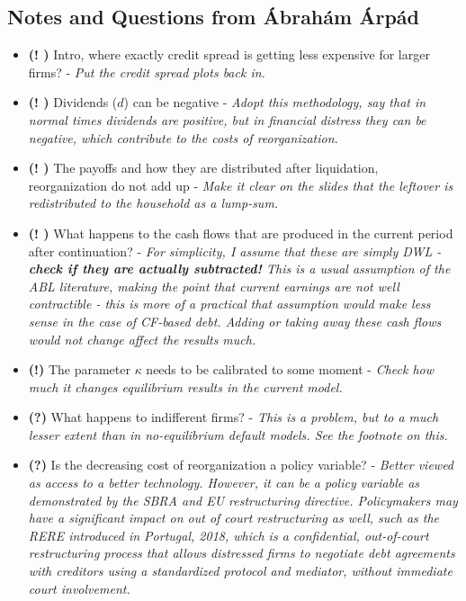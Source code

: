 \documentclass[12pt]{article}
\begin{document}
\subsection*{Notes and Questions from Ábrahám Árpád}
\begin{itemize} \setlength\itemsep{0em}  \small
    \item \textbf{(! \checkmark)} Intro, where exactly credit spread is getting less expensive for larger firms? - \textit{Put the credit spread plots back in.}
    \item \textbf{(! \checkmark)} Dividends ($d$) can be negative - \textit{Adopt this methodology, say that in normal times dividends are positive, but in financial distress they can be negative, which contribute to the costs of reorganization.}
    \item \textbf{(! \checkmark)} The payoffs and how they are distributed after liquidation, reorganization do not add up - \textit{Make it clear on the slides that the leftover is redistributed to the household as a lump-sum.}
    \item \textbf{(! \checkmark)} What happens to the cash flows that are produced in the current period after continuation? - \textit{For simplicity, I assume that these are simply DWL - \textbf{check if they are actually subtracted!} This is a usual assumption of the ABL literature, making the point that current earnings are not well contractible - this is more of a practical that assumption would make less sense in the case of CF-based debt. Adding or taking away these cash flows would not change affect the results much.}
    \item \textbf{(!)} The parameter $\kappa$ needs to be calibrated to some moment - \textit{Check how much it changes equilibrium results in the current model.}
    \item \textbf{(?)} What happens to indifferent firms? - \textit{This is a problem, but to a much lesser extent than in no-equilibrium default models. See the footnote on this.}
    \item \textbf{(?)} Is the decreasing cost of reorganization a policy variable? - \textit{Better viewed as access to a better technology. However, it can be a policy variable as demonstrated by the SBRA and EU restructuring directive. Policymakers may have a significant impact on out of court restructuring as well, such as the RERE introduced in Portugal, 2018, which is a confidential, out-of-court restructuring process that allows distressed firms to negotiate debt agreements with creditors using a standardized protocol and mediator, without immediate court involvement.} 

\end{itemize}
\end{document}
